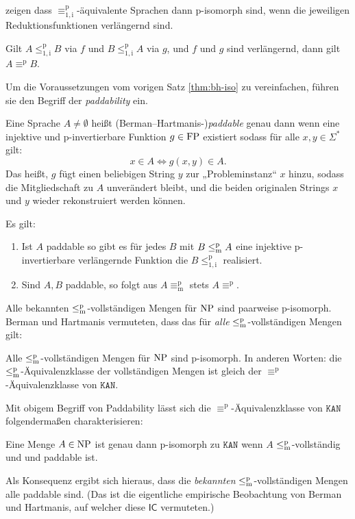 \textcite{berman_isomorphisms_1977} zeigen dass $\equiv_\mathrm{1,i}^\mathrm{p}$-äquivalente Sprachen dann p-isomorph sind, wenn die jeweiligen Reduktionsfunktionen verlängernd sind.
\begin{theorem}\label{thm:bh-iso}
    Gilt $A\leq_\mathrm{1,i}^\mathrm{p} B$ via $f$ und $B\leq_\mathrm{1,i}^\mathrm{p} A$ via $g$, und $f$ und $g$ sind verlängernd, dann gilt $A\equiv^\mathrm{p}B$.
\end{theorem}
Um die Voraussetzungen vom vorigen Satz \ref{thm:bh-iso} zu vereinfachen, führen sie den Begriff der \emph{paddability} ein.
\begin{definition}
    Eine Sprache $A\neq\emptyset$ heißt (Berman–Hartmanis-)\emph{paddable} genau dann wenn eine injektive und p-invertierbare Funktion $g\in \mathrm{FP}$ existiert sodass für alle $x,y\in\Sigma^*$ gilt:
    \[ x\in A \iff g(x,y)\in A. \]
    Das heißt, $g$ fügt einen beliebigen String $y$ zur „Probleminstanz“ $x$ hinzu, sodass die Mitgliedschaft zu $A$ unverändert bleibt, und die beiden originalen Strings $x$ und $y$ wieder rekonstruiert werden können. 
\end{definition}
Es gilt:
\begin{theorem}
    \begin{enumerate}
        \item Ist $A$ paddable so gibt es für jedes $B$ mit $B\leq_\mathrm{m}^\mathrm{p} A$ eine injektive p-invertierbare verlängernde Funktion die $B\leq_\mathrm{1,i}^\mathrm{p}$ realisiert.
        \item Sind $A, B$ paddable, so folgt aus $A\equiv_\mathrm{m}^\mathrm{p}$ stets $A\equiv^\mathrm{p}$.
    \end{enumerate}
\end{theorem}
Alle bekannten $\leq_\mathrm{m}^\mathrm{p}$-vollständigen Mengen für $\mathrm{NP}$ sind paarweise p-isomorph. 
Berman und Hartmanis vermuteten, dass das für \emph{alle} $\leq_\mathrm{m}^\mathrm{p}$-vollständigen Mengen gilt:
\begin{conjecture}[$\mathsf{IC}$]
    Alle $\leq_\mathrm{m}^\mathrm{p}$-vollständigen Mengen für $\mathrm{NP}$ sind p-isomorph.
    In anderen Worten: die $\leq_\mathrm{m}^\mathrm{p}$-Äquivalenzklasse der vollständigen Mengen ist gleich der  $\equiv^\mathrm{p}$-Äquivalenzklasse von $\mathtt{KAN}$.
\end{conjecture}
Mit obigem Begriff von Paddability lässt sich die $\equiv^\mathrm{p}$-Äquivalenzklasse von $\mathtt{KAN}$ folgendermaßen charakterisieren:
\begin{theorem}
    Eine Menge $A\in\mathrm{NP}$ ist genau dann p-isomorph zu $\mathtt{KAN}$ wenn $A$ $\leq_\mathrm{m}^\mathrm{p}$-vollständig und und paddable ist.
\end{theorem}
Als Konsequenz ergibt sich hieraus, dass die \emph{bekannten} $\leq_\mathrm{m}^\mathrm{p}$-vollständigen Mengen alle paddable sind. (Das ist die eigentliche empirische Beobachtung von Berman und Hartmanis, auf welcher diese $\mathsf{IC}$ vermuteten.)

